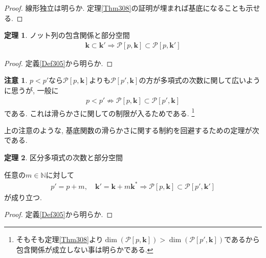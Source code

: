 \documentclass{jsarticle}
\newcommand\subknot[1]{{#1}^*}
\theoremstyle{definition}%
\newtheorem{thm}{定理}
\newtheorem*{rem}{注意}
\begin{document}
\begin{proof}
    線形独立は明らか.
    定理\ref{Thm308}の証明が埋まれば基底になることも示せる.
\end{proof}

\begin{screen}
	\begin{thm}
        \label{Thm310}
		ノット列の包含関係と部分空間
		\begin{align}
			\bm{k}\subset\bm{k}'
			\Rightarrow
			\mathcal{P}[p, \bm{k}]\subset \mathcal{P}[p, \bm{k}']
		\end{align}
	\end{thm}
\end{screen}
\begin{proof}
	定義\ref{Def305}から明らか.
\end{proof}

\begin{rem}
	$p<p'$なら$\mathcal{P}[p, \bm{k}]$よりも$\mathcal{P}[p', \bm{k}]$の方が多項式の次数に関して広いように思うが, 一般に
	\begin{align}
		p<p'
		\not\Rightarrow
		\mathcal{P}[p, \bm{k}]\subset \mathcal{P}[p', \bm{k}]
	\end{align}
	である.
	これは滑らかさに関しての制限が入るためである.%
	\footnote{そもそも定理\ref{Thm308}より$\dim(\mathcal{P}[p, \bm{k}])>\dim(\mathcal{P}[p', \bm{k}])$であるから包含関係が成立しない事は明らかである.}
\end{rem}

上の注意のような, 基底関数の滑らかさに関する制約を回避するための定理が次である.
\begin{screen}
	\begin{thm}
        \label{Thm311}
		区分多項式の次数と部分空間

		任意の$m\in\mathbb{N}$に対して
		\begin{align}
			p'=p+m, \quad
			\bm{k}'=\bm{k}+m\subknot{\bm{k}}
			\Rightarrow
			\mathcal{P}[p, \bm{k}]\subset \mathcal{P}[p', \bm{k}']
		\end{align}
		が成り立つ.
	\end{thm}
\end{screen}
\begin{proof}
	定義\ref{Def305}から明らか.
\end{proof}



\newpage
\end{document}
